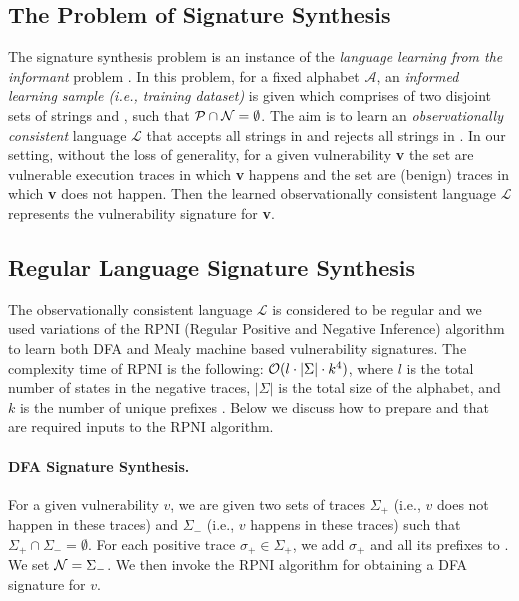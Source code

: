 \subsection{The Problem of Signature Synthesis}
The signature synthesis problem is
an instance of the \emph{language learning from the informant} problem \cite{informant_learning}.
In this problem, for a fixed alphabet $\mathcal{A}$,
an \emph{informed learning sample (i.e., training dataset)}  is given which
comprises of two disjoint sets of strings
 and , such that $\mathcal{P}\cap \mathcal{N}=\emptyset$.
The aim is to learn an \emph{observationally
consistent}  language $\mathcal{L}$ that accepts all strings in  and rejects all strings in .
In our setting, without the loss of generality,
for a given vulnerability \textbf{v} the set  are vulnerable execution traces in which \textbf{v} happens
and the set  are (benign) traces in which \textbf{v} does not happen. Then the
learned observationally consistent
language $\mathcal{L}$ represents the vulnerability signature for \textbf{v}.




\subsection{Regular Language Signature Synthesis}
\label{sec:regular_languages}
The observationally consistent language $\mathcal{L}$ is considered to be
regular and
we used variations of the
RPNI (Regular Positive and Negative Inference) algorithm \cite{rpni}
to learn both DFA and Mealy machine based vulnerability signatures.
The complexity time of RPNI is the
following: $\mathcal{O}(l\cdot\vert\Sigma\vert\cdot k^4)$, where $l$ is the total
number of states in the negative traces, $\vert\Sigma\vert$ is the total size
of the alphabet, and $k$ is the number of unique prefixes \cite{rpni}.
Below we discuss how to prepare  and  that are
required inputs to the RPNI algorithm.


\paragraph{DFA Signature Synthesis.} For a given vulnerability $v$,
we are given two sets of traces $\Sigma_+$ (i.e., $v$ does not happen in these traces)
and $\Sigma_{-}$ (i.e., $v$ happens in these traces) such that
$\Sigma_+ \cap \Sigma_{-} = \emptyset$. For each  positive trace $\sigma_+\in\Sigma_+$,
we add $\sigma_+$ and all its prefixes to . We set $\mathcal{N}=\Sigma_{-}$.
We then invoke the RPNI \cite{rpni} algorithm for obtaining a DFA signature for $v$.

